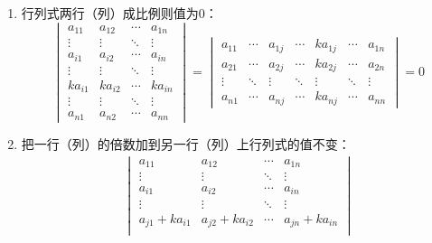 \begin{property}
\begin{enumerate}
\begin{gather*}
\begin{vmatrix}
			\end{vmatrix}=-
			\begin{vmatrix}
				a_{11} & \cdots & a_{1j} & \cdots & a_{1i} & \cdots & a_{1n} \\
				a_{21} & \cdots & a_{2j} & \cdots & a_{2i} & \cdots & a_{2n} \\
				\vdots & \ddots & \vdots & \ddots & \vdots & \ddots & \vdots \\
				a_{n1} & \cdots & a_{nj} & \cdots & a_{ni} & \cdots & a_{nn}
			\end{vmatrix}
		\end{gather*}
		\item 行列式两行（列）成比例则值为$0$：
		\begin{equation*}
			\begin{vmatrix}
			a_{11} & a_{12} & \cdots & a_{1n} \\
			\vdots & \vdots & \ddots & \vdots \\
			a_{i1} & a_{i2} & \cdots & a_{in} \\
			\vdots & \vdots & \ddots & \vdots \\
			ka_{i1} & ka_{i2} & \cdots & ka_{in} \\
			\vdots & \vdots & \ddots & \vdots \\
			a_{n1} & a_{n2} & \cdots & a_{nn}
			\end{vmatrix}=
			\begin{vmatrix}
			a_{11} & \cdots & a_{1j} & \cdots & ka_{1j} & \cdots & a_{1n} \\
			a_{21} & \cdots & a_{2j} & \cdots & ka_{2j} & \cdots & a_{2n} \\
			\vdots & \ddots & \vdots & \ddots & \vdots & \ddots & \vdots \\
			a_{n1} & \cdots & a_{nj} & \cdots & ka_{nj} & \cdots & a_{nn}
			\end{vmatrix}=0
		\end{equation*}
		\item 把一行（列）的倍数加到另一行（列）上行列式的值不变：
		\begin{gather*}
			\begin{vmatrix}
				a_{11} & a_{12} & \cdots & a_{1n} \\
				\vdots & \vdots & \ddots & \vdots \\
				a_{i1} & a_{i2} & \cdots & a_{in} \\
				\vdots & \vdots & \ddots & \vdots \\
				a_{j1}+ka_{i1} & a_{j2}+ka_{i2} & \cdots & a_{jn}+ka_{in} \\

\end{vmatrix}
\end{gather*}
\end{enumerate}
\end{property}
